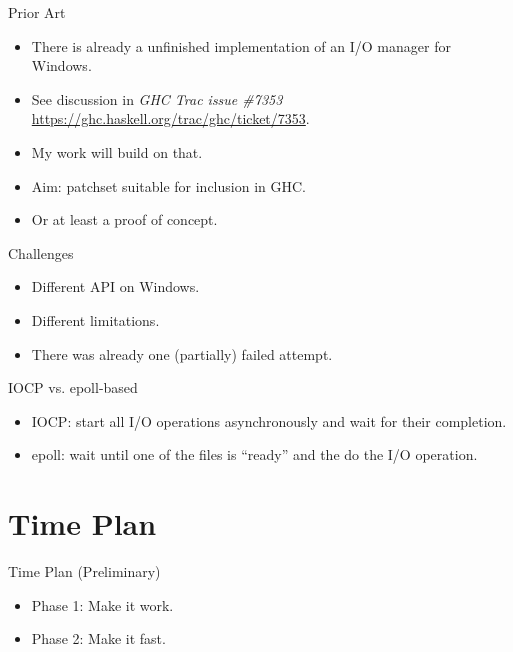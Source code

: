 \documentclass{beamer}
\begin{document}
\begin{frame}{Prior Art}
  \begin{itemize}
  \item There is already a unfinished implementation of an I/O manager for
    Windows.
  \item See discussion in \emph{GHC Trac issue \#7353}
    \url{https://ghc.haskell.org/trac/ghc/ticket/7353}.
  \item My work will build on that.
  \item Aim: patchset suitable for inclusion in GHC.
  \item Or at least a proof of concept.
  \end{itemize}
\end{frame}

\begin{frame}{Challenges}
  \begin{itemize}
  \item Different API on Windows.
  \item Different limitations.
  \item There was already one (partially) failed attempt.
  \end{itemize}
\end{frame}

\begin{frame}{IOCP vs. epoll-based}
  \begin{itemize}
  \item IOCP: start all I/O operations asynchronously and wait for their
    completion.
  \item epoll: wait until one of the files is ``ready'' and the do the I/O
    operation.
  \end{itemize}
\end{frame}

\section {Time Plan}



\begin{frame}{Time Plan (Preliminary)}
  \begin{itemize}
  \item Phase 1: Make it work.
  \item Phase 2: Make it fast.
  \end{itemize}
\end{frame}
\end{document}

